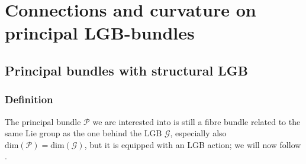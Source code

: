 \documentclass[reqno,a4paper,oneside]{amsart}
\theoremstyle{plain}
\theoremstyle{remark}
\theoremstyle{definition}
\begin{document}
\section{Connections and curvature on principal LGB-bundles}\label{ConnCurvOnPrincLGBBundle}

\subsection{Principal bundles with structural LGB}\label{PrincBundlLGBBased}

\subsubsection{Definition}

The principal bundle $\mathcal{P}$ we are interested into is still a fibre bundle related to the same Lie group as the one behind the LGB $\mathcal{G}$, especially also $\mathrm{dim}(\mathcal{P}) = \mathrm{dim}(\mathcal{G})$, but it is equipped with an LGB action; we will now follow \cite[\S 5.7, page 144f.]{GroupoidBasedPrincipalBundles}.
\end{document}
